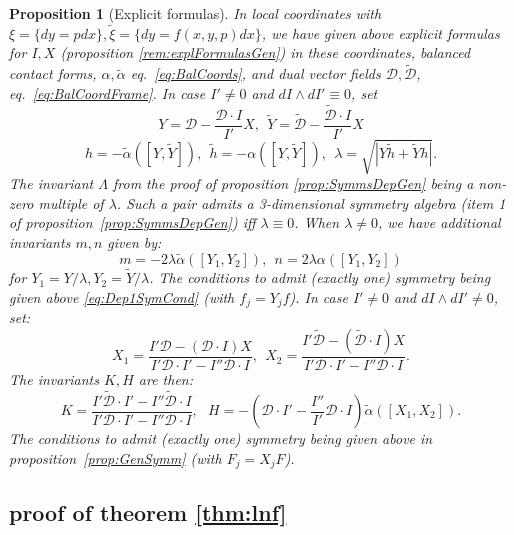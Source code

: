 \documentclass[10pt]{amsart}
\newtheorem{prop}[thm]{Proposition}
\theoremstyle{definition}
\begin{document}
\begin{prop}[Explicit formulas]\label{rem:GenSum}  In local coordinates with $\xi = \{ dy = pdx\}, \tilde \xi = \{ dy = f(x,y,p)dx\}$, we have given above explicit formulas for $I, X$ (proposition \ref{rem:explFormulasGen}) in these coordinates, balanced contact forms, $\alpha, \tilde\alpha$ eq.~\eqref{eq:BalCoords}, and dual vector fields $\mathcal{D}, \mathcal{\tilde D}$, eq.~\eqref{eq:BalCoordFrame}. 
In case $I'\ne 0$ and $dI\wedge dI'\equiv 0$, set
\[ Y = \mathcal{D}- \frac{\mathcal{D}\cdot I}{I'} X, ~~\tilde Y = \mathcal{\tilde D} - \frac{\mathcal{\tilde D}\cdot I}{I'}X\]
\[ h = - \tilde\alpha ([Y, \tilde Y]), ~~\tilde h = - \alpha([Y, \tilde Y]), ~~\lambda = \sqrt{|Y\tilde h + \tilde Yh|}. \]
The invariant $\Lambda$ from the proof of proposition \ref{prop:SymmsDepGen} being a non-zero multiple of $\lambda$. Such a pair admits a 3-dimensional symmetry algebra (item 1 of proposition~\ref{prop:SymmsDepGen}) iff $\lambda \equiv 0$. When $\lambda\ne 0$, we have additional invariants $m,n$ given by:
\[ m = -2\lambda \tilde\alpha([Y_1, Y_2]), ~~n = 2\lambda\alpha([Y_1, Y_2]) \]
for $Y_1 = Y/\lambda, Y_2 = \tilde Y/\lambda$. The conditions to admit (exactly one) symmetry being given above \eqref{eq:Dep1SymCond}  (with $f_j = Y_jf$). In case $I'\ne 0$ and $dI\wedge dI'\ne 0$, set:
    \[ X_1 = \frac{I' \mathcal{D} - (\mathcal{D}\cdot I) X}{I'\mathcal{D}\cdot I' - I'' \mathcal{D}\cdot I}, ~~X_2 = \frac{I' \mathcal{\tilde D} - (\mathcal{\tilde D}\cdot I) X}{I' \mathcal{D}\cdot I' - I'' \mathcal{D}\cdot I}. \]
    The invariants $K,H$ are then:   
    \[ K = \frac{I'\mathcal{\tilde D}\cdot I' - I'' \mathcal{\tilde D}\cdot I}{I'\mathcal{D}\cdot I' - I'' \mathcal{D}\cdot I}, ~~~ H = - (\mathcal{D}\cdot I' - \frac{I''}{I'}\mathcal{D}\cdot I) \tilde\alpha ( [X_1, X_2]). \]
    The conditions to admit (exactly one) symmetry being given above in proposition~\ref{prop:GenSymm}  (with $F_j = X_jF$).
\end{prop}



\subsection{proof of theorem \ref{thm:lnf}} \label{sec:prf} 
\end{document}
